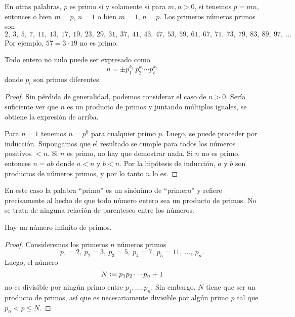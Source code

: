 \documentclass{article}
\numberwithin{equation}{section}
\begin{document}
En otras palabras, $p$ es primo si y solamente si para $m,n > 0$, si tenemos
$p = mn$, entonces o bien $m = p$, $n = 1$ o bien $m = 1$, $n = p$. Los primeros
números primos son
$$2, ~ 3, ~ 5, ~ 7, ~ 11, ~ 13, ~ 17, ~ 19, ~ 23, ~ 29, ~ 31, ~ 37, ~ 41, ~ 43, ~ 47, ~ 53, ~ 59, ~ 61, ~ 67, ~ 71, ~ 73, ~ 79, ~ 83, ~ 89, ~ 97, ~ \ldots$$
Por ejemplo, $57 = 3\cdot 19$ no es primo.

\begin{proposicion}
  \label{prop:todo-entero-es-producto-de-primos}
  Todo entero no nulo puede ser expresado como
  $$n = \pm p_1^{k_1}\,p_2^{k_2}\cdots p_\ell^{k_\ell}$$
  donde $p_i$ son primos diferentes.

  \begin{proof}
    Sin pérdida de generalidad, podemos considerar el caso de $n > 0$. Sería
    suficiente ver que $n$ es un producto de primos y juntando múltiplos
    iguales, se obtiene la expresión de arriba.

    Para $n = 1$ tenemos $n = p^0$ para cualquier primo $p$. Luego, se puede
    proceder por inducción. Supongamos que el resultado se cumple para todos los
    números positivos $< n$. Si $n$ es primo, no hay que demostrar nada. Si $n$
    no es primo, entonces $n = ab$ donde $a < n$ y $b < n$. Por la hipótesis de
    inducción, $a$ y $b$ son productos de números primos, y por lo tanto $n$ lo
    es.
  \end{proof}
\end{proposicion}

En este caso la palabra ``primo'' es un sinónimo de ``primero'' y refiere
precisamente al hecho de que todo número entero sea un producto de primos. No se
trata de ninguna relación de parentesco entre los números.

\begin{teorema}[Euclides]
  Hay un número infinito de primos.

  \begin{proof}
    Consideremos los primeros $n$ números primos
    $$p_1 = 2, ~ p_2 = 3, ~ p_3 = 5, ~ p_4 = 7, ~ p_5 = 11, ~ \ldots, ~ p_n.$$
    Luego, el número
    $$N \mathrel{\mathop:}= p_1 p_2 \cdots p_n + 1$$
    no es divisible por ningún primo entre $p_1, \ldots, p_n$. Sin embargo, $N$
    tiene que ser un producto de primos, así que es necesariamente divisible por
    algún primo $p$ tal que $p_n < p \le N$.
  \end{proof}
\end{teorema}

\end{document}
